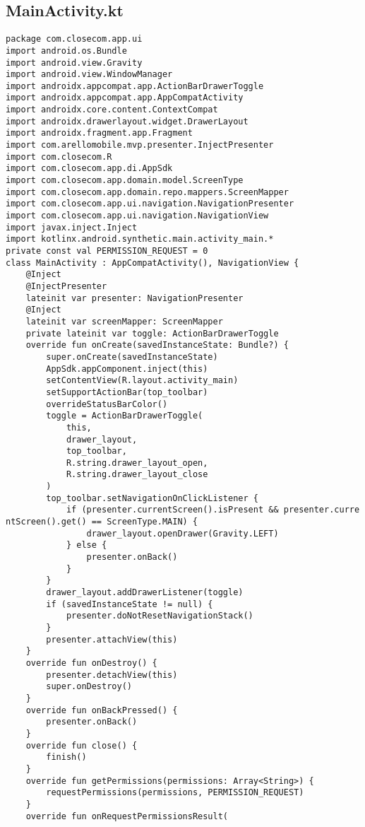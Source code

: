\documentclass[listing]{espd}
\begin{document}
\subsection{MainActivity.kt}
\begin{verbatim}
package com.closecom.app.ui
import android.os.Bundle
import android.view.Gravity
import android.view.WindowManager
import androidx.appcompat.app.ActionBarDrawerToggle
import androidx.appcompat.app.AppCompatActivity
import androidx.core.content.ContextCompat
import androidx.drawerlayout.widget.DrawerLayout
import androidx.fragment.app.Fragment
import com.arellomobile.mvp.presenter.InjectPresenter
import com.closecom.R
import com.closecom.app.di.AppSdk
import com.closecom.app.domain.model.ScreenType
import com.closecom.app.domain.repo.mappers.ScreenMapper
import com.closecom.app.ui.navigation.NavigationPresenter
import com.closecom.app.ui.navigation.NavigationView
import javax.inject.Inject
import kotlinx.android.synthetic.main.activity_main.*
private const val PERMISSION_REQUEST = 0
class MainActivity : AppCompatActivity(), NavigationView {
    @Inject
    @InjectPresenter
    lateinit var presenter: NavigationPresenter
    @Inject
    lateinit var screenMapper: ScreenMapper
    private lateinit var toggle: ActionBarDrawerToggle
    override fun onCreate(savedInstanceState: Bundle?) {
        super.onCreate(savedInstanceState)
        AppSdk.appComponent.inject(this)
        setContentView(R.layout.activity_main)
        setSupportActionBar(top_toolbar)
        overrideStatusBarColor()
        toggle = ActionBarDrawerToggle(
            this,
            drawer_layout,
            top_toolbar,
            R.string.drawer_layout_open,
            R.string.drawer_layout_close
        )
        top_toolbar.setNavigationOnClickListener {
            if (presenter.currentScreen().isPresent && presenter.curre
ntScreen().get() == ScreenType.MAIN) {
                drawer_layout.openDrawer(Gravity.LEFT)
            } else {
                presenter.onBack()
            }
        }
        drawer_layout.addDrawerListener(toggle)
        if (savedInstanceState != null) {
            presenter.doNotResetNavigationStack()
        }
        presenter.attachView(this)
    }
    override fun onDestroy() {
        presenter.detachView(this)
        super.onDestroy()
    }
    override fun onBackPressed() {
        presenter.onBack()
    }
    override fun close() {
        finish()
    }
    override fun getPermissions(permissions: Array<String>) {
        requestPermissions(permissions, PERMISSION_REQUEST)
    }
    override fun onRequestPermissionsResult(

\end{verbatim}
\end{document}
